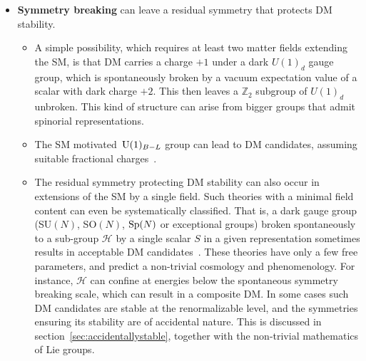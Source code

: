 \begin{itemize}
\begin{itemize}
\item[$\rhd$] 
Gauge-invariant QFT are usually restricted to quantum states on which expectation values satisfy
the classical equations of motion, such as the 1st Maxwell equation (in electromagnetism)
and/or the 1st Friedmann equation (in general relativity).
More general quantum states violate such classical equations, by containing electric or gravitational fields as those
generated by extra stable charge and/or mass, despite that such sources are not present.
This phenomenon can be identified as DM, up to the problem that cosmological inflation would dilute it~\cite{Rajendran24}.
\end{itemize}
\item[$\blacktriangleright$]  
{\bf Symmetry breaking} can leave a residual symmetry that protects DM stability.
\begin{itemize}
\item[$\rhd$] 
A simple possibility, which requires at least two matter fields extending the SM, is that DM carries a charge $+1$ under a  dark $U(1)_d$ gauge group, which is spontaneously broken by a vacuum expectation value of a scalar with dark charge $+2.$ 
This then leaves a $\mathbb{Z}_2$ subgroup of $U(1)_d$ unbroken.
This kind of structure can arise from bigger groups that admit spinorial representations.

\item[$\rhd$]
The SM motivated $\,{\rm U}(1)_{B-L}$ group can lead to DM candidates, assuming suitable fractional charges~\cite{1509.04036}.

\item[$\rhd$] The residual symmetry protecting DM stability can also occur in extensions of the SM by a single field. Such theories with a minimal field content can even be systematically classified.
That is, a dark gauge group (SU$(N)$, SO$(N)$, ${\rm Sp}(N)$ or exceptional groups)
broken spontaneously to a sub-group $\mathcal{H}$ by a single scalar $S$ in a given representation
sometimes results in acceptable DM candidates~\cite{VectorDM}.
These theories have only a few free parameters, and predict a non-trivial cosmology and phenomenology. 
For instance,  $\mathcal{H}$ can confine at energies below the spontaneous symmetry breaking scale, which can result in a composite DM.
In some cases such DM candidates are stable at the renormalizable level, and the symmetries ensuring its stability are of accidental nature.
This is discussed  in section~\ref{sec:accidentallystable}, together with the non-trivial mathematics of Lie groups.
\end{itemize}

\end{itemize}


